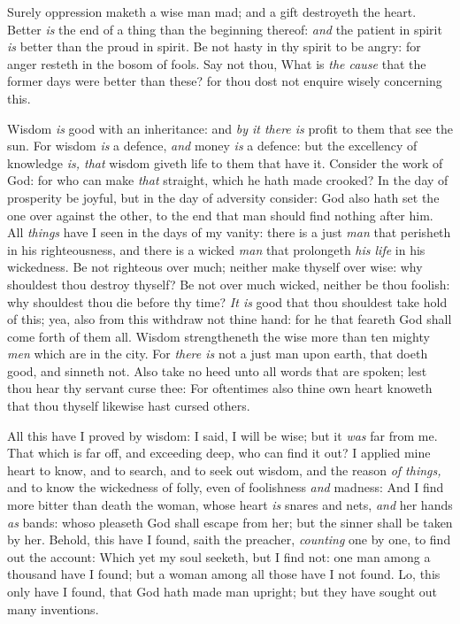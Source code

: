 \documentclass[11pt,letterpaper,oneside]{memoir}
\begin{document}
Surely oppression maketh a wise man mad; and a gift destroyeth the 
heart. Better \emph{is} the end of a thing than the beginning thereof: 
\emph{and} the patient in spirit \emph{is} better than the proud in 
spirit. Be not hasty in thy spirit to be angry: for anger resteth in the 
bosom of fools. Say not thou, What is \emph{the cause} that the former 
days were better than these? for thou dost not enquire wisely concerning 
this. 

Wisdom \emph{is} good with an inheritance: and \emph{by it there is} 
profit to them that see the sun. For wisdom \emph{is} a defence, 
\emph{and} money \emph{is} a defence: but the excellency of knowledge 
\emph{is, that} wisdom giveth life to them that have it. Consider the 
work of God: for who can make \emph{that} straight, which he hath made 
crooked? In the day of prosperity be joyful, but in the day of adversity 
consider: God also hath set the one over against the other, to the end 
that man should find nothing after him. All \emph{things} have I seen in 
the days of my vanity: there is a just \emph{man} that perisheth in his 
righteousness, and there is a wicked \emph{man} that prolongeth 
\emph{his life} in his wickedness. Be not righteous over much; neither 
make thyself over wise: why shouldest thou destroy thyself? Be not over 
much wicked, neither be thou foolish: why shouldest thou die before thy 
time? \emph{It is} good that thou shouldest take hold of this; yea, also 
from this withdraw not thine hand: for he that feareth God shall come 
forth of them all. Wisdom strengtheneth the wise more than ten mighty 
\emph{men} which are in the city. For \emph{there is} not a just man 
upon earth, that doeth good, and sinneth not. Also take no heed unto all 
words that are spoken; lest thou hear thy servant curse thee: For 
oftentimes also thine own heart knoweth that thou thyself likewise hast 
cursed others. 

All this have I proved by wisdom: I said, I will be wise; but it 
\emph{was} far from me. That which is far off, and exceeding deep, who 
can find it out? I applied mine heart to know, and to search, and to 
seek out wisdom, and the reason \emph{of things,} and to know the 
wickedness of folly, even of foolishness \emph{and} madness: And I find 
more bitter than death the woman, whose heart \emph{is} snares and nets, 
\emph{and} her hands \emph{as} bands: whoso pleaseth God shall escape 
from her; but the sinner shall be taken by her. Behold, this have I 
found, saith the preacher, \emph{counting} one by one, to find out the 
account: Which yet my soul seeketh, but I find not: one man among a 
thousand have I found; but a woman among all those have I not found. Lo, 
this only have I found, that God hath made man upright; but they have 
sought out many inventions. 
\end{document}
